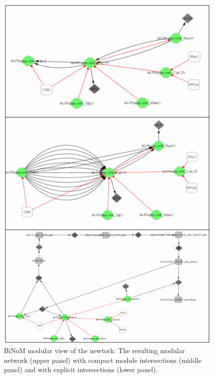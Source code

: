 \begin{figure}
\centering
\includegraphics[width=14 cm]{graphics/Modular_view_The_resulting_modular_network}
\caption{BiNoM modular view of the newtork: The resulting modular network (upper panel) with compact module intersections (middle panel) and with explicit intersections (lower panel).}
\label{Modular_view_The_resulting_modular_network}
\end{figure}

